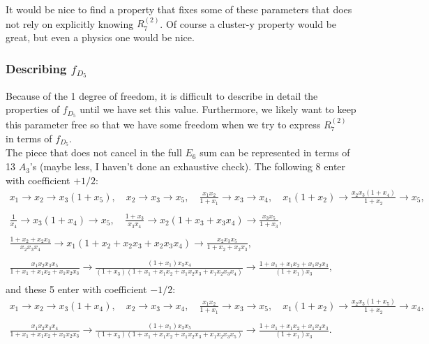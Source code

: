 \documentclass[12pt]{article}
\def\a{\mathcal{A}}
\def\fd5{f_{D_5}}
\def\a2{A_2}
\def\a3{A_3}
\def\e6{E_6}
\def\r27{R^{(2)}_7}
\begin{document}
It would be nice to find a property that fixes some of these parameters that does not rely on explicitly knowing $\r27$. Of course a cluster-y property would be great, but even a physics one would be nice. 

\subsubsection*{Describing $\fd5$}

Because of the 1 degree of freedom, it is difficult to describe in detail the properties of $\fd5$ until we have set this value. Furthermore, we likely want to keep this parameter free so that we have some freedom when we try to express $\r27$ in terms of $\fd5$. \\

The piece that does not cancel in the full $\e6$ sum can be represented in terms of 13 $\a3$'s (maybe less, I haven't done an exhaustive check). The following 8 enter with coefficient $+1/2$:
\begin{gather*}
	x_1\to x_2\to x_3 \left(1+x_5\right),\quad x_2\to x_3\to x_5,\quad \frac{x_1 x_2}{1+x_1}\to x_3\to x_4,\quad x_1\left(1+x_2\right)\to \frac{x_2 x_3\left(1+x_4\right)}{1+x_2}\to x_5,\\ \\
	\frac{1}{x_4}\to x_3 \left(1+x_4\right)\to x_5,\quad \frac{1+x_3}{x_3x_4}\to x_2 \left(1+x_3+x_3 x_4\right)\to \frac{x_3x_5}{1+x_3},\\ \\
	\frac{1+x_2+x_2 x_3}{x_2 x_3 x_4}\to x_1\left(1+x_2+x_2 x_3+x_2 x_3 x_4\right)\to \frac{x_2x_3 x_5}{1+x_2+x_2 x_3},\\ \\
	\frac{x_1 x_2 x_3x_5}{1+x_1+x_1 x_2+x_1 x_2 x_3}\to\frac{\left(1+x_1\right) x_3 x_4}{\left(1+x_3\right)\left(1+x_1+x_1 x_2+x_1 x_2 x_3+x_1 x_2 x_3x_4\right)}\to \frac{1+x_1+x_1 x_2+x_1 x_2x_3}{\left(1+x_1\right) x_3},\\
\end{gather*}
and these 5 enter with coefficient $-1/2$:
\begin{gather*}
	x_1\to x_2\to x_3 \left(1+x_4\right),\quad x_2\to x_3\to x_4,\quad \frac{x_1 x_2}{1+x_1}\to x_3\to x_5,\quad x_1\left(1+x_2\right)\to \frac{x_2 x_3\left(1+x_5\right)}{1+x_2}\to x_4,\\ \\
	\frac{x_1 x_2 x_3x_4}{1+x_1+x_1 x_2+x_1 x_2 x_3}\to\frac{\left(1+x_1\right) x_3 x_5}{\left(1+x_3\right)\left(1+x_1+x_1 x_2+x_1 x_2 x_3+x_1 x_2 x_3x_5\right)}\to \frac{1+x_1+x_1 x_2+x_1 x_2x_3}{\left(1+x_1\right) x_3}.
\end{gather*}
\end{document}
